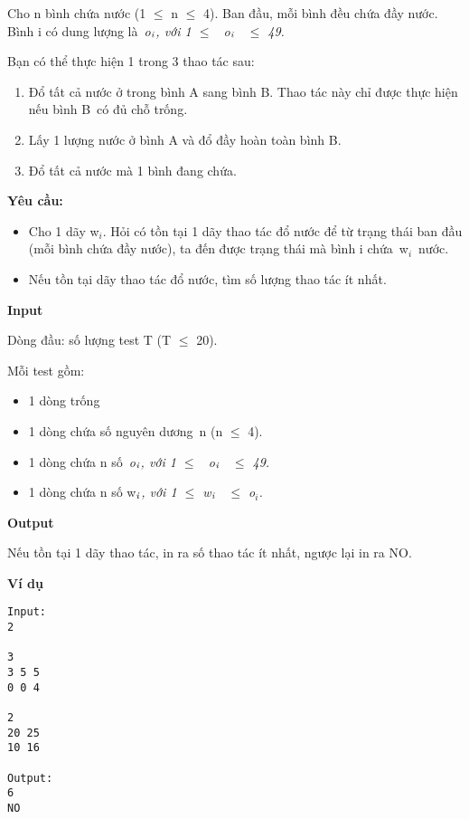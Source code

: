 

Cho n bình chứa nước (1  $\le$  n  $\le$  4). Ban đầu, mỗi bình đều chứa đầy nước. Bình i có dung lượng là \emph{o}$_\emph{i}$\emph{, với 1  $\le$  o}$_\emph{i}$\emph{  $\le$  49.}

Bạn có thể thực hiện 1 trong 3 thao tác sau:
\begin{enumerate}
	\item Đổ tất cả nước ở trong bình A sang bình B. Thao tác này chỉ được thực hiện nếu bình B có đủ chỗ trống.
	\item Lấy 1 lượng nước ở bình A và đổ đầy hoàn toàn bình B.
	\item Đổ tất cả nước mà 1 bình đang chứa.
\end{enumerate}

\textbf{Yêu cầu: }
\begin{itemize}
	\item Cho 1 dãy w$_i$. Hỏi có tồn tại 1 dãy thao tác đổ nước để từ trạng thái ban đầu (mỗi bình chứa đầy nước), ta đến được trạng thái mà bình i chứa w$_i$ nước.
	\item Nếu tồn tại dãy thao tác đổ nước, tìm số lượng thao tác ít nhất.
\end{itemize}

\textbf{Input}

Dòng đầu: số lượng test T (T  $\le$  20).

Mỗi test gồm:
\begin{itemize}
	\item 1 dòng trống
	\item 1 dòng chứa số nguyên dương n (n  $\le$  4).
	\item 1 dòng chứa n số \emph{o}$_\emph{i}$\emph{, với 1  $\le$  o}$_\emph{i}$\emph{  $\le$  49.}
	\item 1 dòng chứa n số w$_\emph{i}$\emph{, với 1  $\le$  w}$_\emph{i}$\emph{  $\le$  o$_i$.}
\end{itemize}

\textbf{Output}

Nếu tồn tại 1 dãy thao tác, in ra số thao tác ít nhất, ngược lại in ra NO.

\textbf{Ví dụ}
\begin{verbatim}
Input:
2

3
3 5 5
0 0 4

2
20 25
10 16

Output:
6
NO
\end{verbatim}
